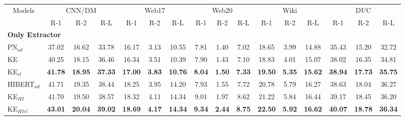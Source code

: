 \begin{table*}[ht!]
	\centering
	\small
	\begin{tabular}{|l|c|c|c|c|c|c|c|c|c|c|c|c|c|c|c|c|}
        \hline
		\multicolumn{2}{|c|}{\multirow{2}{*}{Models}} &\multicolumn{3}{|c|}{CNN/DM} & \multicolumn{3}{|c|}{Web17} & \multicolumn{3}{|c|}{Web20} & \multicolumn{3}{|c|}{Wiki} & \multicolumn{3}{|c|}{DUC}\\ 
        \cline{3-17}
		\multicolumn{2}{|c|}{} &  R-1 & R-2 & R-L & R-1 & R-2 & R-L &  R-1 & R-2 & R-L & R-1 & R-2 & R-L & R-1 & R-2 & R-L \\
        \hline
        \multicolumn{17}{|l|}{\bf Only Extractor}\\
        \cline{3-17}
        \hline
		\multicolumn{2}{|l|}{PN$_{ad}$} & 37.02 & 16.62 & 33.78 & 16.17& 3.13 &10.55 & 7.81 & 1.40 & 7.02 & 18.65 & 3.99 & 14.88 & 35.43 & 15.20 & 32.72\\
		\multicolumn{2}{|l|}{KE} & 40.25 & 18.15 & 36.46 & 16.34 & 3.51 & 10.39 & 7.90& 1.43 & 7.10 & 18.83 & 4.01 & 15.07 & 38.02 & 16.35 & 34.81 \\
		\multicolumn{2}{|l|}{KE$_{cl}$} & \bf 41.78 & \bf 18.95 & \bf 37.33 & \bf 17.00 & \bf 3.83 & \bf 10.76 & \bf 8.04 & \bf 1.50 & \bf 7.33  & \bf 19.50 & \bf 5.35 & \bf 15.62 & \bf 38.94 & \bf 17.73 & \bf 35.75 \\
        \hline
		\multicolumn{2}{|l|}{HIBERT$_{ad}$} & 41.71 & 19.35 & 38.44 & 18.25 & 3.95 & 14.20 & 7.93 & 1.55 & 7.72 & 20.78 & 5.79 & 16.27 & 38.63 & 18.04 & 36.27\\
		\multicolumn{2}{|l|}{KE$_{HI}$} & 41.70 & 19.50 & 38.57 & 18.32 & 4.11 & 14.34& 9.01 & 1.97 & 8.62 & 21.22 & 5.84 & 16.44 & 39.17 & 18.45 & 36.20 \\
		\multicolumn{2}{|l|}{KE$_{HIcl}$} & \bf 43.01& \bf 20.04 & \bf 39.02 & \bf 18.69 & \bf 4.17 & \bf 14.34 & \bf 9.34 & \bf 2.44 & \bf 8.75& \bf 22.50 & \bf 5.92 & \bf 16.62 & \bf 40.07 & \bf 18.78 & \bf 36.34\\
        \hline

\end{tabular}
\end{table*}
